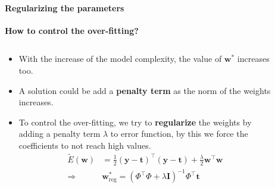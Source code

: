 \begin{frame}{\insertsubsection}
	\framesubtitle{Regularizing the parameters}
	\textcolor{UniGold}{\textbf{How to control the over-fitting?}}
	\begin{columns}
		\begin{column}{0.475\textwidth}
			\begin{itemize}	
			\item With the increase of the model complexity, the value of $\mathbf{w}^*$ increases too.
			\item A solution could be add a \textcolor{UniOrange}{\textbf{penalty term}} as the norm of the weights increases.
			\item To control the over-fitting, we try to \textcolor{UniOrange}{\textbf{regularize}} the weights by adding a penalty term $\lambda$ to error function, by this we force the coefficients to not reach high values.
			\begin{align*}
				\tilde{E}(\mathbf{w}) &=\frac{1}{2} (\mathbf{y}-\mathbf{t})^{\top}(\mathbf{y}-\mathbf{t}) +\frac{\lambda}{2} \mathbf{w}^{\top}\mathbf{w} \\
		\Rightarrow & \mathbf{w}^*_\text{reg} = \left( \Phi^{\top} \Phi + \lambda \mathbf{I} \right)^{-1} \Phi^{\top} \mathbf{t}
	\end{align*}			
			\end{itemize}
		\end{column}
		\begin{column}{0.475\textwidth}  %
			\centering
			\begin{figure}
				\setlength{}
				
			\end{figure}
		\end{column}
	\end{columns}
\end{frame}


